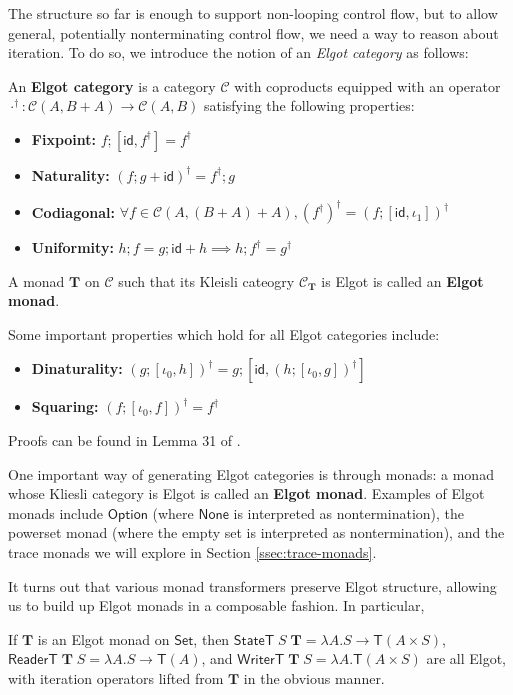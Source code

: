 \documentclass[acmsmall,screen,review]{acmart}
\newcommand{\mc}[1]{\ensuremath{\mathcal{#1}}}
\newcommand{\mb}[1]{\ensuremath{\mathbf{#1}}}
\newcommand{\ms}[1]{\ensuremath{\mathsf{#1}}}
\begin{document}
The structure so far is enough to support non-looping control flow, but to allow
general, potentially nonterminating control flow, we need a way to reason about
iteration. To do so, we introduce the notion of an \textit{Elgot category} as
follows:
\begin{definition} 
  An \textbf{Elgot category} is a category \(\mc{C}\) with coproducts equipped
  with an operator \(\cdot^\dagger: \mc{C}(A, B + A) \to \mc{C}(A, B)\)
  satisfying the following properties:
  \begin{itemize}
    \item \textbf{Fixpoint:} \(f;[\ms{id}, f^\dagger] = f^\dagger\)
    \item \textbf{Naturality:} \((f;g + \ms{id})^\dagger = f^\dagger;g\)
    \item \textbf{Codiagonal:} \(\forall f \in \mc{C}(A, (B + A) + A), (f^\dagger)^\dagger = (f;[\ms{id}, \iota_1])^\dagger\)
    \item \textbf{Uniformity:}
    \(
      h;f = g;\ms{id} + h \implies h;f^\dagger = g^\dagger
    \)
  \end{itemize}
  A monad \(\mb{T}\) on \(\mc{C}\) such that its Kleisli cateogry
  \(\mc{C}_{\mb{T}}\) is Elgot is called an \textbf{Elgot monad}.
\end{definition}
Some important properties which hold for all Elgot categories include:
\begin{itemize}
  \item \textbf{Dinaturality:} \((g;[\iota_0, h])^\dagger = g;[\ms{id},
  (h;[\iota_0, g])^\dagger]\)
  \item \textbf{Squaring:} \((f;[\iota_0, f])^\dagger = f^\dagger\)
\end{itemize}
Proofs can be found in Lemma 31 of \cite{goncharov-squaring}.

One important way of generating Elgot categories is through monads: a monad
whose Kliesli category is Elgot is called an \textbf{Elgot monad}. Examples of
Elgot monads include \(\ms{Option}\) (where \(\ms{None}\) is interpreted as
nontermination), the powerset monad (where the empty set is interpreted as
nontermination), and the trace monads we will explore in Section
\ref{ssec:trace-monads}.

It turns out that various monad transformers preserve Elgot structure, allowing
us to build up Elgot monads in a composable fashion. In particular,
\begin{proposition}
  If \(\mb{T}\) is an Elgot monad on \(\ms{Set}\), then \(\ms{StateT}\;S\;\mb{T}
  = \lambda A. S \to \ms{T}(A \times S)\), \(\ms{ReaderT}\;\mb{T}\;S = \lambda
  A. S \to \ms{T}(A)\), and \(\ms{WriterT}\;\mb{T}\;S = \lambda A. \ms{T}(A
  \times S)\) are all Elgot, with iteration operators lifted from \(\mb{T}\) in
  the obvious manner.
\end{proposition}
\end{document}
